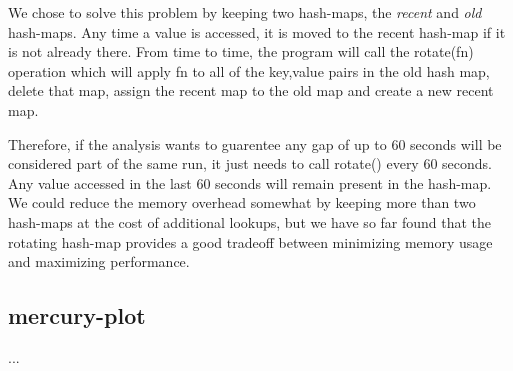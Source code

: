 We chose to solve this problem by keeping two hash-maps, the {\it
recent} and {\it old} hash-maps.  Any time a value is accessed, it is
moved to the recent hash-map if it is not already there.  From time to
time, the program will call the rotate(fn) operation which will apply
fn to all of the key,value pairs in the old hash map, delete that map,
assign the recent map to the old map and create a new recent map.

Therefore, if the analysis wants to guarentee any gap of up to 60
seconds will be considered part of the same run, it just needs to call
rotate() every 60 seconds.  Any value accessed in the last 60 seconds
will remain present in the hash-map.  We could reduce the memory
overhead somewhat by keeping more than two hash-maps at the cost of
additional lookups, but we have so far found that the rotating
hash-map provides a good tradeoff between minimizing memory usage and
maximizing performance.

\subsection{mercury-plot}

...

